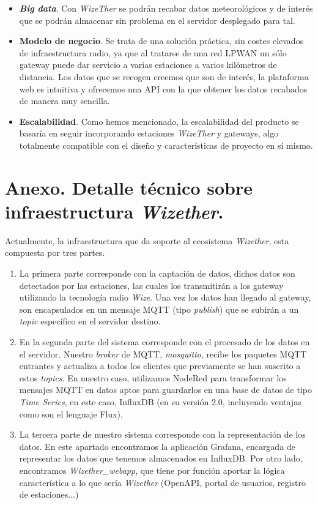 \documentclass[12pt]{article}
\begin{document}
\begin{itemize}
	\item \textbf{\textit{Big data}}. Con \textit{WizeTher} se podrán recabar datos meteorológicos y de interés que se podrán almacenar sin problema en el servidor desplegado para tal. 
	\item \textbf{Modelo de negocio}. Se trata de una solución práctica, sin costes elevados de infraestructura radio, ya que al tratarse de una red LPWAN un sólo gateway puede dar servicio a varias estaciones a varios kilómetros de distancia. Los datos que se recogen creemos que son de interés, la plataforma web es intuitiva y ofrecemos una API con la que obtener los datos recabados de manera muy sencilla.
	\item \textbf{Escalabilidad}. Como hemos mencionado, la escalabilidad del producto se basaría en seguir incorporando estaciones \textit{WizeTher} y gateways, algo totalmente compatible con el diseño y características de proyecto en sí mismo.
\end{itemize}


\pagebreak

\section{Anexo. Detalle técnico sobre infraestructura \textit{Wizether}.}

\noindent Actualmente, la infraestructura que da soporte al ecosistema \textit{Wizether}, esta compuesta por tres partes. 

\begin{enumerate}
	\item La primera parte corresponde con la captación de datos, dichos datos son detectados por las estaciones, las cuales los transmitirán a los gateway utilizando la tecnología radio \textit{Wize}. Una vez los datos han llegado al gateway, son encapsulados en un mensaje MQTT (tipo \textit{publish}) que se subirán a un \textit{topic} específico en el servidor destino.
	
	\item En la segunda parte del sistema corresponde con el procesado de los datos en el servidor. Nuestro \textit{broker} de MQTT, \textit{mosquitto}, recibe los paquetes MQTT entrantes y actualiza a todos los clientes que previamente se han suscrito a estos \textit{topics}. En nuestro caso, utilizamos NodeRed para transformar los mensajes MQTT en datos aptos para guardarlos en una base de datos de tipo \textit{Time Series}, en este caso, InfluxDB (en su versión 2.0, incluyendo ventajas como son el lenguaje Flux).
	
	\item La tercera parte de nuestro sistema corresponde con la representación de los datos. En este apartado encontramos la aplicación Grafana, encargada de representar los datos que tenemos almacenados en InfluxDB. Por otro lado, encontramos \textit{Wizether\_webapp}, que tiene por función aportar la lógica característica a lo que sería \textit{Wizether} (OpenAPI, portal de usuarios, registro de estaciones...)
\end{enumerate}
\end{document}
